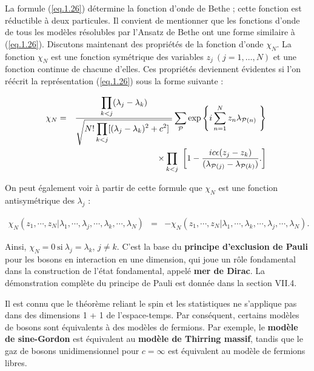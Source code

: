 La formule (\ref{eq.1.26}) détermine la fonction d'onde de Bethe ; cette fonction est réductible à deux particules. Il convient de mentionner que les fonctions d'onde de tous les modèles résolubles par l'Ansatz de Bethe ont une forme similaire à (\ref{eq.1.26}). Discutons maintenant des propriétés de la fonction d'onde $\chi_N$. La fonction $\chi_N$ est une fonction symétrique des variables $z_j \ (j = 1, \dots, N)$ et une fonction continue de chacune d'elles. Ces propriétés deviennent évidentes si l'on réécrit la représentation (\ref{eq.1.26}) sous la forme suivante :

\begin{eqnarray}
	\chi_N & = &	\frac{  \displaystyle \prod_{k<j} ( \lambda_j - \lambda_k ) }{ \sqrt{N! \displaystyle \prod_{k<j}  [ ( \lambda_j - \lambda_k )^2 +c^2 ] } }  \sum_{\mathcal{P}}\exp \left \{ i \sum_{n = 1}^N  z_n \lambda_{ \mathcal{P}(n) } \right \} \notag \\
	&& \times \prod_{k<j}  	\left [ 1 - \frac{ic \epsilon(z_j - z_k ) }{( \lambda_{ \mathcal{P}(j) }  - \lambda_{ \mathcal{P}(k) }  ) }.  \right ] 
\end{eqnarray}

On peut également voir à partir de cette formule que $\chi_N$ est une fonction antisymétrique des $\lambda_j$ :

\begin{eqnarray}
	\chi_N ( z_1 , \cdots , z_N \vert \lambda_1 , \cdots , \lambda_j , \cdots , \lambda_k , \cdots , \lambda_N ) & =& - 	\chi_N ( z_1 , \cdots , z_N \vert \lambda_1 , \cdots , \lambda_k , \cdots , \lambda_j , \cdots , \lambda_N ).
\end{eqnarray}

Ainsi, $\chi_N = 0 \ \text{si} \ \lambda_j = \lambda_k$, $j \neq k$. C’est la base du \textbf{principe d'exclusion de Pauli} pour les bosons en interaction en une dimension, qui joue un rôle fondamental dans la construction de l'état fondamental, appelé \textbf{mer de Dirac}. La démonstration complète du principe de Pauli est donnée dans la section VII.4.

Il est connu que le théorème reliant le spin et les statistiques ne s'applique pas dans des dimensions 1 + 1 de l'espace-temps. Par conséquent, certains modèles de bosons sont équivalents à des modèles de fermions. Par exemple, le \textbf{modèle de sine-Gordon} est équivalent au \textbf{modèle de Thirring massif}, tandis que le gaz de bosons unidimensionnel pour $c = \infty$ est équivalent au modèle de fermions libres.

